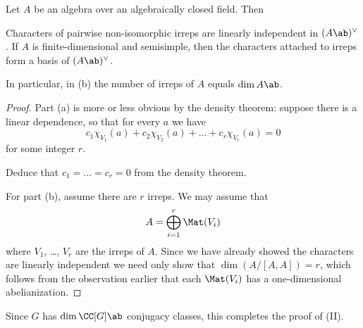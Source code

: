 \begin{theorem}
	Let $A$ be an algebra over an algebraically closed field. Then
	\begin{enumerate}[(a)]
		\ii Characters of pairwise non-isomorphic irreps are
		linearly independent in $(A\ab)^\vee$.
		\ii If $A$ is finite-dimensional and semisimple,
		then the characters attached to irreps
		form a basis of $(A\ab)^\vee$.
	\end{enumerate}
	In particular, in (b) the number of irreps of $A$ equals $\dim A\ab$.
\end{theorem}
\begin{proof}
	Part (a) is more or less obvious by the density theorem:
	suppose there is a linear dependence, so that for every $a$ we have
	\[ c_1 \chi_{V_1}(a) + c_2 \chi_{V_2}(a) + \dots + c_r \chi_{V_r} (a) = 0\]
	for some integer $r$.
	\begin{ques}
		Deduce that $c_1 = \dots = c_r = 0$ from the density theorem.
	\end{ques}
	For part (b), assume there are $r$ irreps.
	We may assume that \[ A = \bigoplus_{i=1}^r \Mat(V_i) \]
	where $V_1$, \dots, $V_r$ are the irreps of $A$.
	Since we have already showed the characters are linearly independent
	we need only show that $\dim ( A / [A,A] ) = r$,
	which follows from the observation earlier that each $\Mat(V_i)$
	has a one-dimensional abelianization.
\end{proof}
Since $G$ has $\dim \CC[G]\ab$ conjugacy classes,
this completes the proof of (II).

